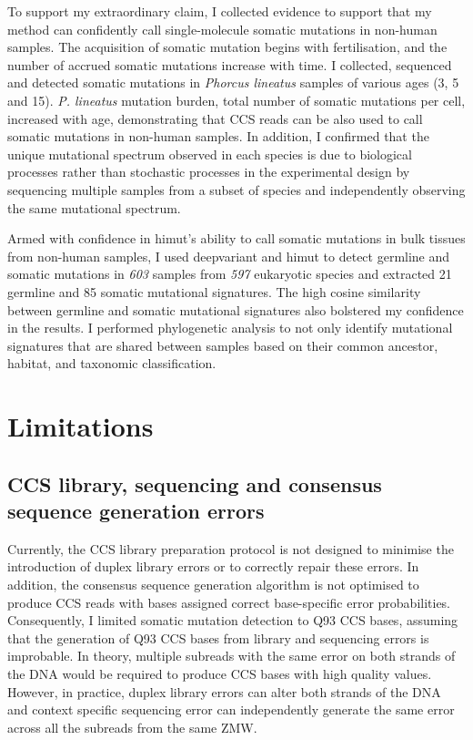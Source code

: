 To support my extraordinary claim, I collected evidence to support that my method can confidently call single-molecule somatic mutations in non-human samples. The acquisition of somatic mutation begins with fertilisation, and the number of accrued somatic mutations increase with time.  I collected, sequenced and detected somatic mutations in \textit{Phorcus lineatus} samples of various ages (3, 5 and 15). \textit{P. lineatus} mutation burden, total number of somatic mutations per cell, increased with age, demonstrating that CCS reads can be also used to call somatic mutations in non-human samples. In addition, I confirmed that the unique mutational spectrum observed in each species is due to biological processes rather than stochastic processes in the experimental design by sequencing multiple samples from a subset of species and independently observing the same mutational spectrum. 

Armed with confidence in himut's ability to call somatic mutations in bulk tissues from non-human samples, I used deepvariant and himut to detect germline and somatic mutations in \textit{603} samples from \textit{597} eukaryotic species and extracted 21 germline and 85 somatic mutational signatures. The high cosine similarity between germline and somatic mutational signatures also bolstered my confidence in the results. I performed phylogenetic analysis to not only identify mutational signatures that are shared between samples based on their common ancestor, habitat, and taxonomic classification. 

\section{Limitations}

\subsection{CCS library, sequencing and consensus sequence generation errors}

Currently, the CCS library preparation protocol is not designed to minimise the introduction of duplex library errors or to correctly repair these errors. In addition, the consensus sequence generation algorithm is not optimised to produce CCS reads with bases assigned correct base-specific error probabilities. Consequently, I limited somatic mutation detection to Q93 CCS bases, assuming that the generation of Q93 CCS bases from library and sequencing errors is improbable. In theory, multiple subreads with the same error on both strands of the DNA would be required to produce CCS bases with high quality values. However, in practice, duplex library errors can alter both strands of the DNA and context specific sequencing error can independently generate the same error across all the subreads from the same ZMW.  


